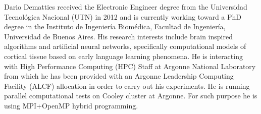 \documentclass[10pt,journal,compsoc]{IEEEtran}
\begin{document}




%



% 

\begin{IEEEbiography}{Dario Dematties}
	received the Electronic Engineer degree from the Universidad Tecnol\'ogica Nacional (UTN) in 2012 and is currently working toward a PhD degree in the Instituto de Ingenier\'ia Biom\'edica, Facultad de Ingenier\'ia, Universidad de Buenos Aires. His research interests include brain inspired algorithms and artificial neural networks, specifically computational models of cortical tissue based on early language learning phenomena. He is interacting with High Performance Computing (HPC) Staff at Argonne National Laboratory from which he has been provided with an Argonne Leadership Computing Facility (ALCF) allocation in order to carry out his experiments. He is running parallel computational tests on Cooley cluster at Argonne. For such purpose he is using MPI+OpenMP hybrid programming.
\end{IEEEbiography}
\end{document}

